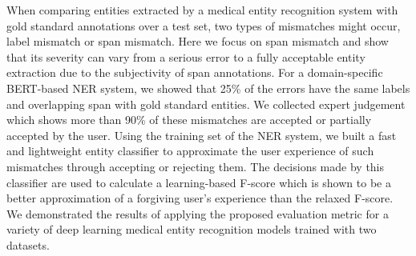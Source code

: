 When comparing entities extracted by a medical entity recognition system with gold standard annotations over a test set, two types of mismatches might occur, label mismatch or span mismatch. Here we focus on span mismatch and show that its severity can vary from a serious error to a fully acceptable entity extraction due to the subjectivity of span annotations. For a domain-specific BERT-based NER system, we showed that 25\% of the errors have the same labels and overlapping span with gold standard entities. We collected expert judgement which shows more than 90\% of these mismatches are accepted or partially accepted by the user. Using the training set of the NER system, we built a fast and lightweight entity classifier to approximate the user experience of such mismatches through accepting or rejecting them. The decisions made by this classifier are used to calculate a learning-based F-score which is shown to be a better approximation of a forgiving user's experience than the relaxed F-score. We demonstrated the results of applying the proposed evaluation metric for a variety of deep learning medical entity recognition models trained with two datasets.
